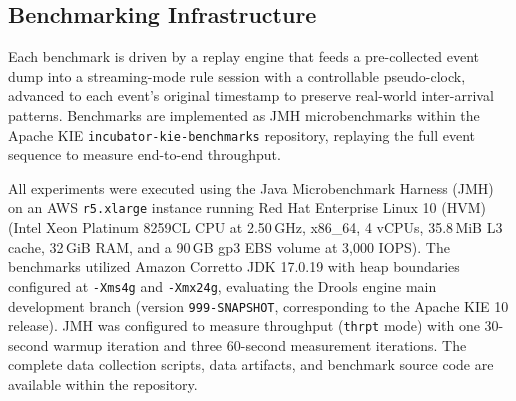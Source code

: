 \subsection{Benchmarking Infrastructure}\label{sec:infra}

Each benchmark is driven by a replay engine that feeds a pre-collected event dump into a streaming-mode rule session with a controllable pseudo-clock, advanced to each event's original timestamp to preserve real-world inter-arrival patterns.
Benchmarks are implemented as JMH microbenchmarks within the Apache KIE \texttt{incubator-kie-benchmarks} repository, replaying the full event sequence to measure end-to-end throughput.

All experiments were executed using the Java Microbenchmark Harness (JMH) on an AWS \texttt{r5.xlarge} instance running Red Hat Enterprise Linux 10 (HVM) (Intel Xeon Platinum 8259CL CPU at 2.50\,GHz, x86\_64, 4 vCPUs, 35.8\,MiB L3 cache, 32\,GiB RAM, and a 90\,GB gp3 EBS volume at 3,000 IOPS). 
The benchmarks utilized Amazon Corretto JDK 17.0.19 with heap boundaries configured at \texttt{-Xms4g} and \texttt{-Xmx24g}, evaluating the Drools engine main development branch (version \texttt{999-SNAPSHOT}, corresponding to the Apache KIE 10 release).
JMH was configured to measure throughput (\texttt{thrpt} mode) with one 30-second warmup iteration and three 60-second measurement iterations.
The complete data collection scripts, data artifacts, and benchmark source code are available within the repository.
